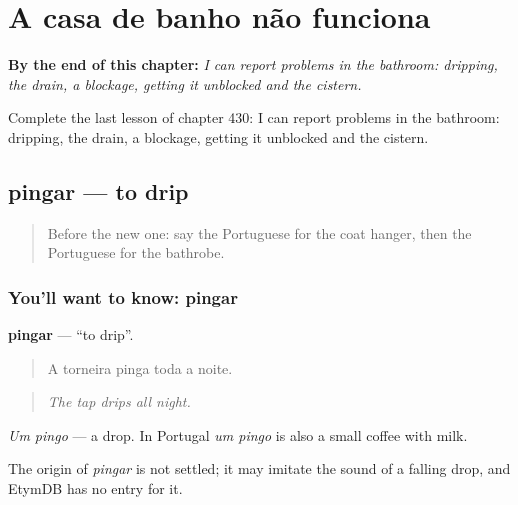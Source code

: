 
\chapter{A casa de banho não funciona}
\label{ch:pt-a-casa-de-banho-nao-funciona}

\begin{chapteropening}
\textbf{By the end of this chapter:} \emph{I can report problems in the bathroom: dripping, the drain, a blockage, getting it unblocked and the cistern.}

Complete the last lesson of chapter 430: I can report problems in the bathroom: dripping, the drain, a blockage, getting it unblocked and the cistern.
\end{chapteropening}

\section[pingar]{pingar — to drip}

\label{lesson:PT-C430-pingar}



\begin{quote}
Before the new one: say the Portuguese for the coat hanger, then the Portuguese for the bathrobe.
\end{quote}

\subsection*{You'll want to know: pingar}
\textbf{pingar} — \textquotedblleft{}to drip\textquotedblright{}.

\begin{quote}
A torneira pinga toda a noite.
\end{quote}

\begin{quote}
\emph{The tap drips all night.}
\end{quote}

\emph{Um pingo} — a drop. In Portugal \emph{um pingo} is also a small coffee with milk.

\begin{cousinweb}
The origin of \emph{pingar} is not settled; it may imitate the sound of a falling drop, and EtymDB has no entry for it.
\end{cousinweb}

